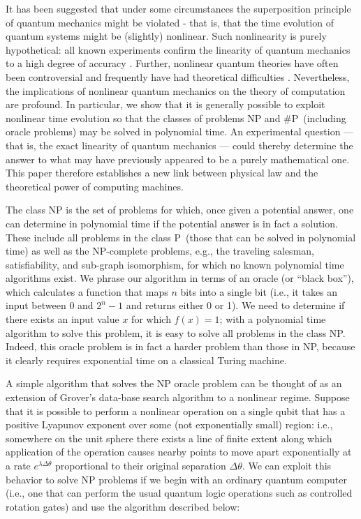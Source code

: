 \documentclass[12pt]{article}
\begin{document}
It has been suggested \cite{Weinberg,Weinberg 2,Fivel,Levy,Bertolami} 
that under some circumstances the superposition principle of
quantum mechanics might be violated - that is, that the time evolution of
quantum systems might be (slightly) nonlinear. Such nonlinearity is purely
hypothetical: all known experiments confirm the linearity of quantum mechanics
to a high degree of accuracy \cite{Majumder,Walsworth,Chupp,Bollinger}. Further, nonlinear quantum theories have often been
controversial and frequently have had theoretical difficulties \cite{Peres,Polchinski,Gisin}.
Nevertheless, the implications of nonlinear
quantum mechanics on the theory of computation are profound. In particular, we
show that it is generally possible to exploit nonlinear time evolution so that
the classes of problems NP and \#P\ (including oracle problems) may be solved
in polynomial time. An experimental question --- that is, the exact linearity of
quantum mechanics --- could thereby determine the answer to what may have
previously appeared to be a purely mathematical one. This paper therefore
establishes a new link between physical law and the theoretical power of
computing machines.

The class NP is the set of problems for which, once given a potential answer,
one can determine in polynomial time if the potential answer is in fact a
solution. These include all problems in the class P\ (those that can be solved
in polynomial time) as well as the NP-complete problems, e.g., the traveling
salesman, satisfiability, and sub-graph isomorphism, for which no known
polynomial time algorithms exist. We phrase our algorithm in terms of an
oracle (or ``black box''), which calculates a function that maps $n$ bits into a
single bit (i.e., it takes an input between 0 and $2^{n}-1$ and returns either
0 or 1). We need to determine if there exists an input value $x$ for which $f(x)
= 1$; with a polynomial time algorithm to solve this problem, it is easy to
solve all problems in the class NP. Indeed, this oracle problem is in fact a
harder problem than those in NP, because it clearly requires exponential time
on a classical Turing machine.

A simple algorithm that solves the NP oracle problem can be thought of as an
extension of Grover's data-base search algorithm \cite{Grover} to a nonlinear
regime. Suppose that it is possible to perform a nonlinear operation on a
single qubit that has a positive Lyapunov exponent over some (not
exponentially small) region: i.e., somewhere on the unit sphere there exists a
line of finite extent along which application of the operation causes nearby
points to move apart exponentially at a rate $e^{\lambda\Delta\theta}$
proportional to their original separation $\Delta\theta.$ We can exploit this
behavior to solve NP problems if we begin with an ordinary quantum computer
(i.e., one that can perform the usual quantum logic operations such as
controlled rotation gates) and use the algorithm described below:
\end{document}
